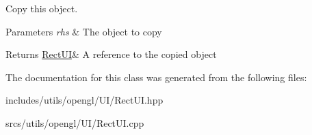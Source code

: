 Copy this object. 


\begin{DoxyParams}{Parameters}
{\em rhs} & The object to copy \\
\hline
\end{DoxyParams}
\begin{DoxyReturn}{Returns}
\hyperlink{class_rect_u_i}{Rect\+UI}\& A reference to the copied object 
\end{DoxyReturn}


The documentation for this class was generated from the following files\+:\begin{DoxyCompactItemize}
\item 
includes/utils/opengl/\+U\+I/Rect\+U\+I.\+hpp\item 
srcs/utils/opengl/\+U\+I/Rect\+U\+I.\+cpp\end{DoxyCompactItemize}
